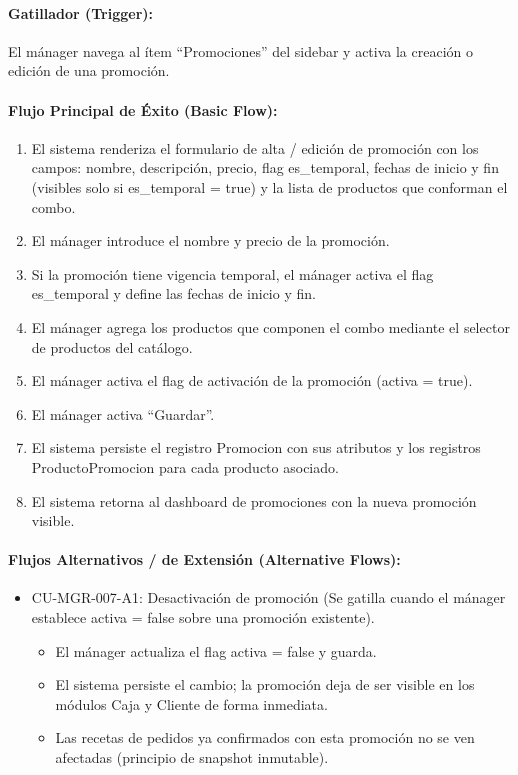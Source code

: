 \paragraph{Gatillador (Trigger):} El mánager navega al ítem ``Promociones'' del sidebar y activa la creación o edición de una promoción.

\paragraph{Flujo Principal de Éxito (Basic Flow):}
\begin{enumerate}
    \item[I.] El sistema renderiza el formulario de alta / edición de promoción con los campos: nombre, descripción, precio, flag es\_temporal, fechas de inicio y fin (visibles solo si es\_temporal = true) y la lista de productos que conforman el combo.
    \item[II.] El mánager introduce el nombre y precio de la promoción.
    \item[III.] Si la promoción tiene vigencia temporal, el mánager activa el flag es\_temporal y define las fechas de inicio y fin.
    \item[IV.] El mánager agrega los productos que componen el combo mediante el selector de productos del catálogo.
    \item[V.] El mánager activa el flag de activación de la promoción (activa = true).
    \item[VI.] El mánager activa ``Guardar''.
    \item[VII.] El sistema persiste el registro Promocion con sus atributos y los registros ProductoPromocion para cada producto asociado.
    \item[VIII.] El sistema retorna al dashboard de promociones con la nueva promoción visible.
\end{enumerate}

\paragraph{Flujos Alternativos / de Extensión (Alternative Flows):}
\begin{itemize}
    \item CU-MGR-007-A1: Desactivación de promoción (Se gatilla cuando el mánager establece activa = false sobre una promoción existente).
    \begin{itemize}
        \item El mánager actualiza el flag activa = false y guarda.
        \item El sistema persiste el cambio; la promoción deja de ser visible en los módulos Caja y Cliente de forma inmediata.
        \item Las recetas de pedidos ya confirmados con esta promoción no se ven afectadas (principio de snapshot inmutable).
    \end{itemize}
\end{itemize}


